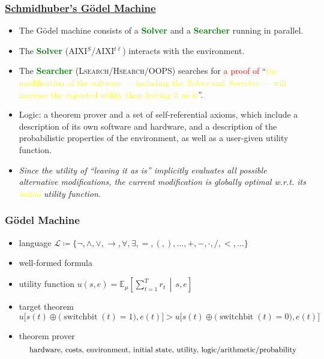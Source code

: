 \documentclass[UTF8,11pt,colorlinks,compress,openany]{beamer}%
\begin{document}
\begin{frame}\frametitle{\href{http://people.idsia.ch/~juergen/ultimatecognition.pdf}{Schmidhuber's G\"odel Machine}}
	\begin{block}{}
		\begin{itemize}
			\item The G\"odel machine consists of a \textcolor{green}{\textbf{Solver}} and a \textcolor{green}{\textbf{Searcher}} running in parallel.
			\item The \textcolor{green}{\textbf{Solver}} (AIXI$^S$/AIXI$^{t\ell}$) interacts with the environment.
			\item The \textcolor{green}{\textbf{Searcher}} (\textsc{Lsearch}/\textsc{Hsearch}/OOPS) searches for \textcolor{red}{a proof of} ``\textcolor{yellow}{the modification of the software --- including the \textit{Solver} and \textit{Searcher} --- will increase the expected utility than leaving it as is}''.
			\item Logic: a theorem prover and a set of self-referential axioms, which include a description of its own software and hardware, and a description of the probabilistic properties of the environment, as well as a user-given utility function.
			\item \emph{Since the utility of ``leaving it as is'' implicitly evaluates all possible alternative modifications, the current modification is globally optimal w.r.t. its \textcolor{yellow}{initial} utility function.}
		\end{itemize}
	\end{block}
\end{frame}

\begin{frame}\frametitle{G\"odel Machine}
\begin{itemize}
	\item language $\mathscr{L}\coloneqq \{\neg,\wedge,\vee,\to,\forall,\exists,=,(,),\ldots,+,-,\cdot,/,<,\ldots\}$
	\item well-formed formula
	\item utility function $u(s,e)=\mathbb{E}_\mu \left[\sum\limits_{t=1}^T r_t\,\middle|\,s,e\right]$
	\item target theorem
\[u\big[s(t)\oplus\big(\operatorname{switchbit}(t)=1\big), e(t)\big] > u\big[s(t)\oplus\big(\operatorname{switchbit}(t)=0\big), e(t)\big]\]
	\item theorem prover
	\[\text{\small hardware, costs, environment, initial state, utility, logic/arithmetic/probability}\]
\end{itemize}
\end{frame}
\end{document}
